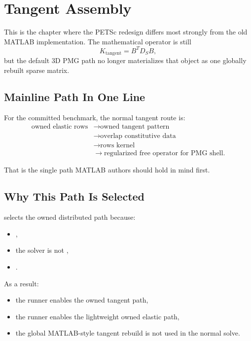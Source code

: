 \chapter{Tangent Assembly}

This is the chapter where the PETSc redesign differs most strongly from the old
MATLAB implementation. The mathematical operator is still
\[
K_{\mathrm{tangent}} = B^T D_S B,
\]
but the default 3D PMG path no longer materializes that object as one globally
rebuilt sparse matrix.

\section{Mainline Path In One Line}

For the committed benchmark, the normal tangent route is:
\[
\begin{aligned}
\text{owned elastic rows}
&\rightarrow \text{owned tangent pattern} \\
&\rightarrow \text{overlap constitutive data} \\
&\rightarrow \text{rows kernel} \\
&\rightarrow \text{regularized free operator for PMG shell}.
\end{aligned}
\]

That is the single path MATLAB authors should hold in mind first.

\section{Why This Path Is Selected}

 selects the owned distributed path because:
\begin{itemize}
\item {},
\item the solver is not ,
\item {}.
\end{itemize}

As a result:
\begin{itemize}
\item the runner enables the owned tangent path,
\item the runner enables the lightweight owned elastic path,
\item the global MATLAB-style tangent rebuild is not used in the normal solve.
\end{itemize}


